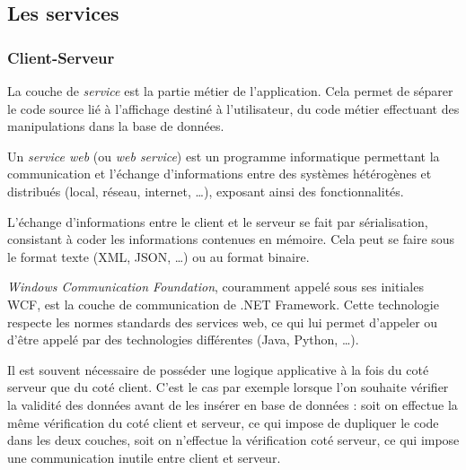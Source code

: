 
\subsection{Les services}


\subsubsection{Client-Serveur}

La couche de \textit{service} est la partie métier de l'application. Cela permet de séparer le code source lié à l'affichage destiné à l'utilisateur, du code métier effectuant des manipulations dans la base de données.



Un \textit{service web} (ou \textit{web service}) est un programme informatique permettant la communication et l'échange d'informations entre des systèmes hétérogènes et distribués (local, réseau, internet, \ldots), exposant ainsi des fonctionnalités.

L'échange d'informations entre le client et le serveur se fait par sérialisation, consistant à coder les informations contenues en mémoire. Cela peut se faire sous le format texte (XML, JSON, \ldots) ou au format binaire.



\textit{Windows Communication Foundation}, couramment appelé sous ses initiales WCF, est la couche de communication de .NET Framework. Cette technologie respecte les normes standards des services web, ce qui lui permet d'appeler ou d'être appelé par des technologies différentes (Java, Python, \ldots).



Il est souvent nécessaire de posséder une logique applicative à la fois du coté serveur que du coté client. C'est le cas par exemple lorsque l'on souhaite vérifier la validité des données avant de les insérer en base de données : soit on effectue la même vérification du coté client et serveur, ce qui impose de dupliquer le code dans les deux couches, soit on n'effectue la vérification coté serveur, ce qui impose une communication inutile entre client et serveur.

